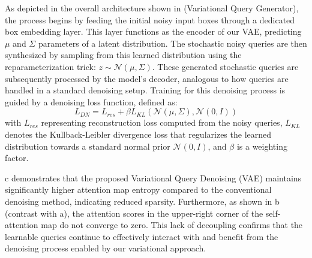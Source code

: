 As depicted in the overall architecture shown in  (Variational Query Generator), the process begins by feeding the initial noisy input boxes through a dedicated box embedding layer. This layer functions as the encoder of our VAE, predicting $\mu$ and $\Sigma$ parameters of a latent distribution. The stochastic noisy queries are then synthesized by sampling from this learned distribution using the reparameterization trick: \(z \sim \mathcal{N}\left(\mu,\Sigma\right)\). These generated stochastic queries are subsequently processed by the model's decoder, analogous to how queries are handled in a standard denoising setup. Training for this denoising process is guided by a denoising loss function, defined as:
\begin{equation}
    L_{DN} = L_{res} + \beta L_{KL}\left(\mathcal{N}\left(\mu,\Sigma\right),\mathcal{N}\left(0,I\right)\right)
    \label{eq:vdn_loss}
\end{equation}
with $L_{res}$ representing reconstruction loss computed from the noisy queries, $L_{KL}$ denotes the Kullback-Leibler divergence loss that regularizes the learned distribution towards a standard normal prior $\mathcal{N}(0,I)$, and $\beta$ is a weighting factor.

c demonstrates that the proposed Variational Query Denoising (VAE) maintains significantly higher attention map entropy compared to the conventional denoising method, indicating reduced sparsity. Furthermore, as shown in b (contrast with a), the attention scores in the upper-right corner of the self-attention map do not converge to zero. This lack of decoupling confirms that the learnable queries continue to effectively interact with and benefit from the denoising process enabled by our variational approach.

